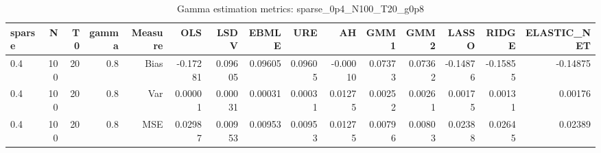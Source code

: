 \begin{table}[!htbp]\centering
\caption{Gamma estimation metrics: sparse_0p4_N100_T20_g0p8}
\label{tab:table1_sparse_0p4_N100_T20_g0p8}
\begin{tabular}{lrrrrrrrrrrrrrr}
\hline
sparse & N & T0 & gamma & Measure & OLS & LSDV & EBMLE & URE & AH & GMM1 & GMM2 & LASSO & RIDGE & ELASTIC_NET \\
\hline
0.4 & 100 & 20 & 0.8 & Bias & -0.17281 & 0.09605 & 0.09605 & 0.09605 & -0.00010 & 0.07373 & 0.07362 & -0.14876 & -0.15855 & -0.14875 \\
0.4 & 100 & 20 & 0.8 & Var & 0.00001 & 0.00031 & 0.00031 & 0.00031 & 0.01275 & 0.00252 & 0.00261 & 0.00175 & 0.00131 & 0.00176 \\
0.4 & 100 & 20 & 0.8 & MSE & 0.02987 & 0.00953 & 0.00953 & 0.00953 & 0.01275 & 0.00796 & 0.00803 & 0.02388 & 0.02645 & 0.02389 \\
\hline
\end{tabular}
\end{table}

